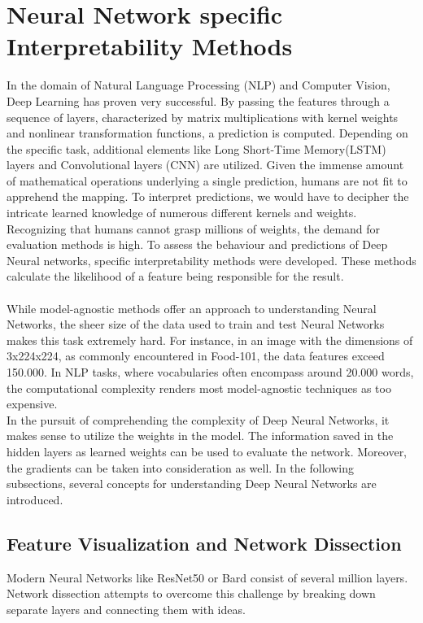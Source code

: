 \section{Neural Network specific Interpretability Methods}
\label{sec:nni}
In the domain of Natural Language Processing (NLP) and Computer Vision, Deep Learning has proven very successful. By passing the features through a sequence of layers, characterized by matrix multiplications with kernel weights and nonlinear transformation functions, a prediction is computed. Depending on the specific task, additional elements like Long Short-Time Memory(LSTM) layers and Convolutional layers (CNN) are utilized. Given the immense amount of mathematical operations underlying a single prediction, humans are not fit to apprehend the mapping. To interpret predictions, we would have to decipher the intricate learned knowledge of numerous different kernels and weights.
Recognizing that humans cannot grasp millions of weights, the demand for evaluation methods is high. To assess the behaviour and predictions of Deep Neural networks, specific interpretability methods were developed. These methods calculate the likelihood of a feature being responsible for the result.
\\\\
While model-agnostic methods offer an approach to understanding Neural Networks, the sheer size of the data used to train and test Neural Networks makes this task extremely hard. For instance, in an image with the dimensions of 3x224x224, as commonly encountered in Food-101, the data features exceed 150.000. In NLP tasks, where vocabularies often encompass around 20.000 words, the computational complexity renders most model-agnostic techniques as too expensive.
\\
In the pursuit of comprehending the complexity of Deep Neural Networks, it makes sense to utilize the weights in the model. The information saved in the hidden layers as learned weights can be used to evaluate the network. Moreover, the gradients can be taken into consideration as well.
In the following subsections, several concepts for understanding Deep Neural Networks are introduced. 


\subsection{Feature Visualization and Network Dissection}
\label{sec:network_dissection}
Modern Neural Networks like ResNet50 or Bard consist of several million layers.\cite{olah2017feature} Network dissection attempts to overcome this challenge by breaking down separate layers and connecting them with ideas. 

